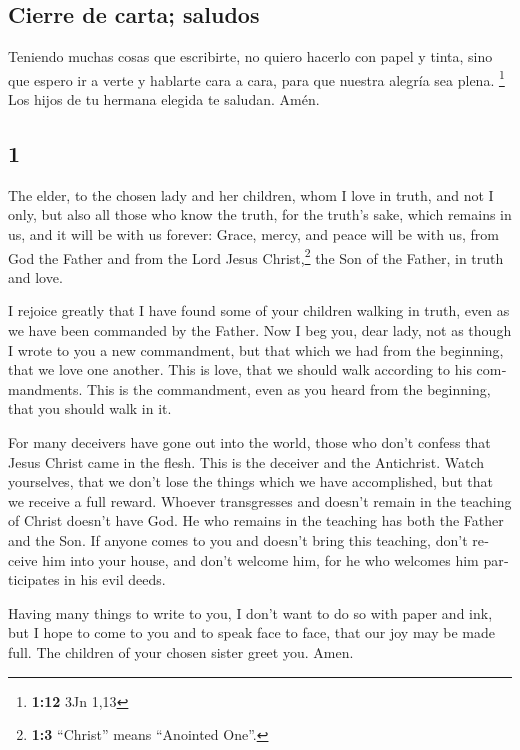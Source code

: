 \begin{paracol}{2}
\hypertarget{cierre-de-carta-saludos}{%
\subsection{Cierre de carta; saludos}\label{cierre-de-carta-saludos}}

 Teniendo muchas cosas que escribirte, no quiero hacerlo
con papel y tinta, sino que espero ir a verte y hablarte cara a cara,
para que nuestra alegría sea plena. \footnote{\textbf{1:12} 3Jn 1,13}
 Los hijos de tu hermana elegida te saludan. Amén.
\switchcolumn \begin{otherlanguage}{english}

\hypertarget{section-1}{%
\section{1}\label{section-1}}

 The elder, to the chosen lady and her children, whom I
love in truth, and not I only, but also all those who know the truth,
 for the truth's sake, which remains in us, and it will be
with us forever:  Grace, mercy, and peace will be with us,
from God the Father and from the Lord Jesus Christ,\footnote{\textbf{1:3}
  ``Christ'' means ``Anointed One''.} the Son of the Father, in truth
and love.

 I rejoice greatly that I have found some of your children
walking in truth, even as we have been commanded by the Father.
 Now I beg you, dear lady, not as though I wrote to you a
new commandment, but that which we had from the beginning, that we love
one another.  This is love, that we should walk according
to his commandments. This is the commandment, even as you heard from the
beginning, that you should walk in it.

 For many deceivers have gone out into the world, those
who don't confess that Jesus Christ came in the flesh. This is the
deceiver and the Antichrist.  Watch yourselves, that we
don't lose the things which we have accomplished, but that we receive a
full reward.  Whoever transgresses and doesn't remain in
the teaching of Christ doesn't have God. He who remains in the teaching
has both the Father and the Son.  If anyone comes to you
and doesn't bring this teaching, don't receive him into your house, and
don't welcome him,  for he who welcomes him participates
in his evil deeds.

 Having many things to write to you, I don't want to do
so with paper and ink, but I hope to come to you and to speak face to
face, that our joy may be made full.  The children of
your chosen sister greet you. Amen. \end{otherlanguage}
\end{paracol}
